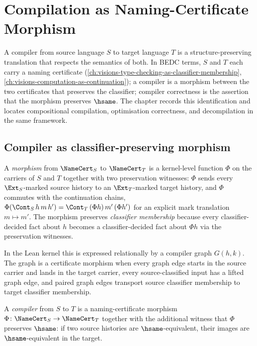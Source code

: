 \chapter{Compilation as Naming-Certificate Morphism}
\label{ch:visions-compilation-as-namecert-morphism}

A compiler from source language $S$ to target language $T$ is a structure-preserving translation that respects the semantics of both. In BEDC terms, $S$ and $T$ each carry a naming certificate (\autoref{ch:visions-type-checking-as-classifier-membership}, \autoref{ch:visions-computation-as-continuation}); a compiler is a morphism between the two certificates that preserves the classifier; compiler correctness is the assertion that the morphism preserves $\hsame$. The chapter records this identification and locates compositional compilation, optimisation correctness, and decompilation in the same framework.

\section{Compiler as classifier-preserving morphism}
\label{sec:compilation-as-namecert-morphism-compiler}

\begin{definition}
\label{def:compilation-namecert-morphism}
A \emph{morphism} from $\NameCert_S$ to $\NameCert_T$ is a kernel-level function $\Phi$ on the carriers of $S$ and $T$ together with two preservation witnesses: $\Phi$ sends every $\Ext_S$-marked source history to an $\Ext_T$-marked target history, and $\Phi$ commutes with the continuation chains, $\Phi(\Cont_S\,h\,m\,h') = \Cont_T\,(\Phi h)\,m'\,(\Phi h')$ for an explicit mark translation $m \mapsto m'$. The morphism preserves \emph{classifier membership} because every classifier-decided fact about $h$ becomes a classifier-decided fact about $\Phi h$ via the preservation witnesses.

In the Lean kernel this is expressed relationally by a compiler graph $G(h,k)$. The graph is a certificate morphism when every graph edge starts in the source carrier and lands in the target carrier, every source-classified input has a lifted graph edge, and paired graph edges transport source classifier membership to target classifier membership.
\end{definition}

\begin{definition}[Compiler]
\label{def:compilation-compiler}
A \emph{compiler} from $S$ to $T$ is a naming-certificate morphism $\Phi \colon \NameCert_S \to \NameCert_T$ together with the additional witness that $\Phi$ preserves $\hsame$: if two source histories are $\hsame$-equivalent, their images are $\hsame$-equivalent in the target.
\end{definition}

